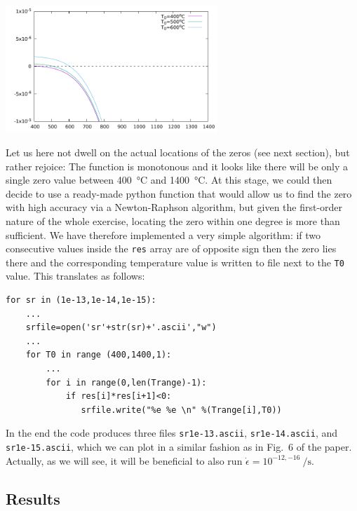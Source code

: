 \begin{center}
\includegraphics[width=8cm]{python_codes/fieldstone_167/lines/res.pdf}
\end{center}

Let us here not dwell on the actual locations of the zeros (see next section), 
but rather rejoice: The function is monotonous and it looks like there will 
be only a single zero value between 400~\si{\celsius} and 1400~\si{\celsius}. 
At this stage, we could then decide to use a ready-made python function that 
would allow us to find the zero with high accuracy via a Newton-Raphson algorithm, 
but given the first-order nature of the whole exercise, locating the 
zero within one degree is more than sufficient. We have therefore implemented
a very simple algorithm: if two consecutive values inside the \lstinline|res|
array are of opposite sign then the zero lies there and the corresponding 
temperature value is written to file next to the \lstinline|T0| value. 
This translates as follows:


\begin{lstlisting}
for sr in (1e-13,1e-14,1e-15):
    ...
    srfile=open('sr'+str(sr)+'.ascii',"w")
    ...
    for T0 in range (400,1400,1):
        ...
        for i in range(0,len(Trange)-1):
            if res[i]*res[i+1]<0: 
               srfile.write("%e %e \n" %(Trange[i],T0))
\end{lstlisting}

In the end the code produces three files
\verb|sr1e-13.ascii|, \verb|sr1e-14.ascii|, and \verb|sr1e-15.ascii|, 
which we can plot in a similar fashion as in Fig.~6 of the paper. 
Actually, as we will see, it will be beneficial to 
also run $\dot\epsilon=10^{-12,-16}~\si{\per\second}$.



\subsection*{Results}


